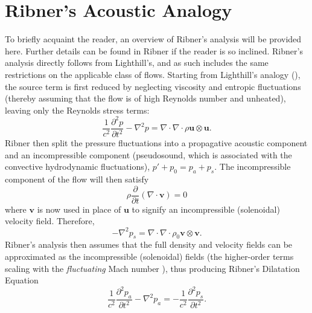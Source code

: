 \section{Ribner's Acoustic Analogy}
To briefly acquaint the reader, an overview of Ribner's analysis will be provided here.
Further details can be found in Ribner \citep{Ribner1962} if the reader is so inclined. 
Ribner's analysis directly follows from Lighthill's, and as such includes the same restrictions on the applicable class of flows.
Starting from Lighthill's analogy (), the source term is first reduced by neglecting viscosity and entropic fluctuations (thereby assuming that the flow is of high Reynolds number and unheated), leaving only the Reynolds stress terms:
\begin{equation}
	\frac{1}{c^2}\frac{\partial^2 p}{\partial t^2} - \nabla^2 p = \nabla \cdot \nabla \cdot \rho \mathbf{u} \otimes \mathbf{u}.
\end{equation}
Ribner then split the pressure fluctuations into a propagative acoustic component and an incompressible component (pseudosound, which is associated with the convective hydrodynamic fluctuations), $p' + p_0 = p_a + p_s$. 
The incompressible component of the flow will then satisfy
\begin{equation}
	 \rho \frac{\partial}{\partial t} (\nabla \cdot \mathbf{v} )  = 0
\end{equation}
where $\mathbf{v}$ is now used in place of $\mathbf{u}$ to signify an incompressible (solenoidal) velocity field. 
Therefore, 
\begin{equation}
	- \nabla^2 p_s = \nabla \cdot \nabla \cdot \rho_0 \mathbf{v} \otimes \mathbf{v}.
	\label{eq:solenoidal_pressure}
\end{equation}
Ribner's analysis then assumes that the full density and velocity fields can be approximated as the incompressible (solenoidal) fields (the higher-order terms scaling with the \textit{fluctuating} Mach number \citep{Ristorcelli1997}), thus producing Ribner's Dilatation Equation
\begin{equation}
	\frac{1}{c^2}\frac{\partial^2 p_a}{\partial t^2} - \nabla^2 p_a = -\frac{1}{c^2}\frac{\partial^2 p_s}{\partial t^2}.
	\label{eq:ribner_source}
\end{equation} 

